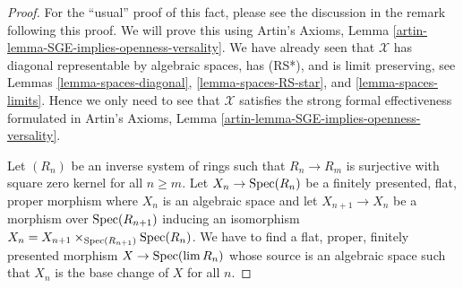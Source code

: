 \begin{proof}
For the ``usual'' proof of this fact, please see the discussion
in the remark following this proof. We will prove this using
Artin's Axioms, Lemma \ref{artin-lemma-SGE-implies-openness-versality}.
We have already seen that $\mathcal{X}$ has diagonal
representable by algebraic spaces, has (RS*), and is limit preserving,
see Lemmas \ref{lemma-spaces-diagonal},
\ref{lemma-spaces-RS-star}, and
\ref{lemma-spaces-limits}.
Hence we only need to see that $\mathcal{X}$ satisfies the strong
formal effectiveness formulated in
Artin's Axioms, Lemma \ref{artin-lemma-SGE-implies-openness-versality}.

\medskip\noindent
Let $(R_n)$ be an inverse system of rings such that
$R_n \to R_m$ is surjective with square zero kernel for
all $n \geq m$. Let $X_n \to \mathop{\mathrm{Spec}}(R_n)$ be a finitely presented,
flat, proper morphism where $X_n$ is an algebraic space and
let $X_{n + 1} \to X_n$ be a morphism over $\mathop{\mathrm{Spec}}(R_{n + 1})$
inducing an isomorphism $X_n = X_{n + 1} \times_{\mathop{\mathrm{Spec}}(R_{n + 1})} \mathop{\mathrm{Spec}}(R_n)$.
We have to find a flat, proper, finitely presented morphism
$X \to \mathop{\mathrm{Spec}}(\mathop{\mathrm{lim}}\nolimits R_n)$ whose source is an algebraic space
such that $X_n$ is the base change of $X$ for all $n$.


\end{proof}
